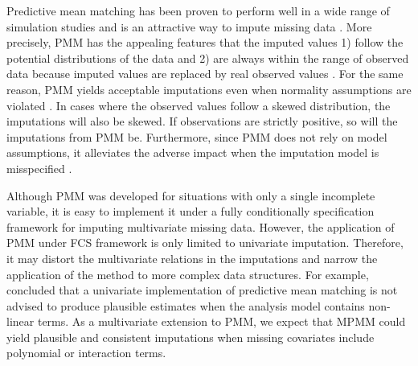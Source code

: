 	Predictive mean matching has been proven to perform well in a wide range of simulation studies and is an attractive way to impute missing data \citep{Buuren2011, Vink2015, Heitjan1991, Morris2014, Vink2014}. More precisely, PMM has the appealing features that the imputed values 1) follow the potential distributions of the data and 2) are always within the range of observed data because imputed values are replaced by real observed values \citep{Buuren2018}. For the same reason, PMM yields acceptable imputations even when normality assumptions are violated \citep{Vink2014}. In cases where the observed values follow a skewed distribution, the imputations will also be skewed. If observations are strictly positive, so will the imputations from PMM be. Furthermore, since PMM does not rely on model assumptions, it alleviates the adverse impact when the imputation model is misspecified \citep{JamesR.Carpenter2013}. 
	
	Although PMM was developed for situations with only a single incomplete variable, it is easy to implement it under a fully conditionally specification framework for imputing multivariate missing data. However, the application of PMM under FCS framework is only limited to univariate imputation. Therefore, it may distort the multivariate relations in the imputations and narrow the application of the method to more complex data structures. For example, \citet{seaman2012multiple} concluded that a univariate implementation of predictive mean matching is not advised to produce plausible estimates when the analysis model contains non-linear terms. As a multivariate extension to PMM, we expect that MPMM could yield plausible and consistent imputations when missing covariates include polynomial or interaction terms.  
	
		
